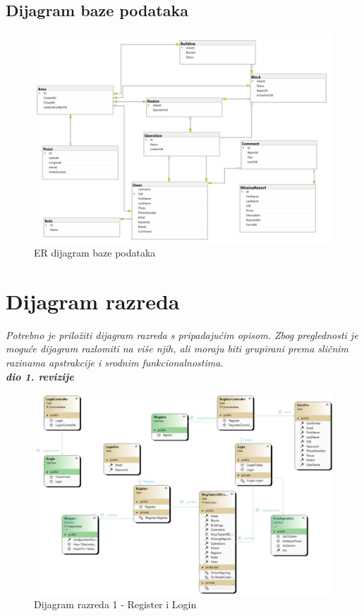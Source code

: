 			\subsection{Dijagram baze podataka}
				\begin{figure}[H]
					\includegraphics[width=15cm]{./slike/ERDijagram.png}
					 \centering
					 \caption{ER dijagram baze podataka}
				\end{figure}
			\eject
			
			
		\section{Dijagram razreda}
		
			\textit{Potrebno je priložiti dijagram razreda s pripadajućim opisom. Zbog preglednosti je moguće dijagram razlomiti na više njih, ali moraju biti grupirani prema sličnim razinama apstrakcije i srodnim funkcionalnostima.}\\
			
			\textbf{\textit{dio 1. revizije}}\\
			
			\begin{figure}[h!] \includegraphics[width=\linewidth]{dijagrami/CD-LoginRegister.png}
				\caption{Dijagram razreda 1 - Register i Login}
			\end{figure}
		
